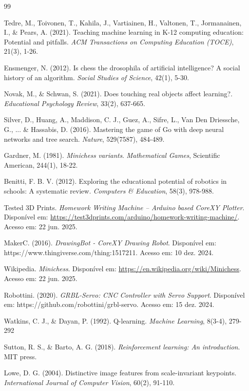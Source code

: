 \documentclass[a4paper]{ifacconf}
\begin{document}
\begin{thebibliography}{99}

Tedre, M., Toivonen, T., Kahila, J., Vartiainen, H., Valtonen, T., Jormanainen, I., \& Pears, A. (2021). Teaching machine learning in K-12 computing education: Potential and pitfalls. \textit{ACM Transactions on Computing Education (TOCE)}, 21(3), 1-26.

Ensmenger, N. (2012). Is chess the drosophila of artificial intelligence? A social history of an algorithm. \textit{Social Studies of Science}, 42(1), 5-30.

Novak, M., \& Schwan, S. (2021). Does touching real objects affect learning?. \textit{Educational Psychology Review}, 33(2), 637-665.

Silver, D., Huang, A., Maddison, C. J., Guez, A., Sifre, L., Van Den Driessche, G., ... \& Hassabis, D. (2016). Mastering the game of Go with deep neural networks and tree search. \textit{Nature}, 529(7587), 484-489.

Gardner, M. (1981). \textit{Minichess variants}. \textit{Mathematical Games}, Scientific American, 244(1), 18-22.

Benitti, F. B. V. (2012). Exploring the educational potential of robotics in schools: A systematic review. \textit{Computers \& Education}, 58(3), 978-988.

Tested 3D Prints. \textit{Homework Writing Machine – Arduino based CoreXY Plotter}. Disponível em: \url{https://test3dprints.com/arduino/homework-writing-machine/}. Acesso em: 22 jun. 2025.

MakerC. (2016). \textit{DrawingBot - CoreXY Drawing Robot}. Disponível em: https://www.thingiverse.com/thing:1517211. Acesso em: 10 dez. 2024.

Wikipedia. \textit{Minichess}. Disponível em: \url{https://en.wikipedia.org/wiki/Minichess}. Acesso em: 22 jun. 2025.

Robottini. (2020). \textit{GRBL-Servo: CNC Controller with Servo Support}. Disponível em: https://github.com/robottini/grbl-servo. Acesso em: 15 dez. 2024.

Watkins, C. J., \& Dayan, P. (1992). Q-learning. \textit{Machine Learning}, 8(3-4), 279-292

Sutton, R. S., \& Barto, A. G. (2018). \textit{Reinforcement learning: An introduction}. MIT press.

Lowe, D. G. (2004). Distinctive image features from scale-invariant keypoints. \textit{International Journal of Computer Vision}, 60(2), 91-110.

\end{thebibliography}
\end{document}
